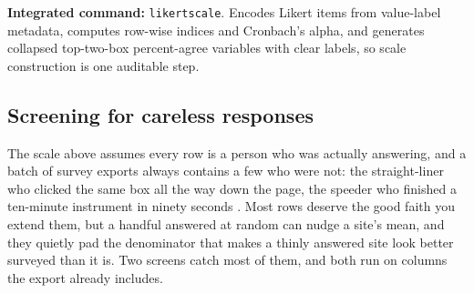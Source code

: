\begin{kaobox}[frametitle=Package Integration: \texttt{likertscale}]
\textbf{Integrated command:} \texttt{likertscale}. Encodes Likert items from value-label metadata, computes row-wise indices and Cronbach's alpha, and generates collapsed top-two-box percent-agree variables with clear labels, so scale construction is one auditable step.
\end{kaobox}

\subsection{Screening for careless responses}\label{sec:ch05-careless}
The scale above assumes every row is a person who was actually answering, and a batch of survey exports always contains a few who were not: the straight-liner who clicked the same box all the way down the page, the speeder who finished a ten-minute instrument in ninety seconds \parencite{osborne2013cleaning}. Most rows deserve the good faith you extend them, but a handful answered at random can nudge a site's mean, and they quietly pad the denominator that makes a thinly answered site look better surveyed than it is. Two screens catch most of them, and both run on columns the export already includes.

